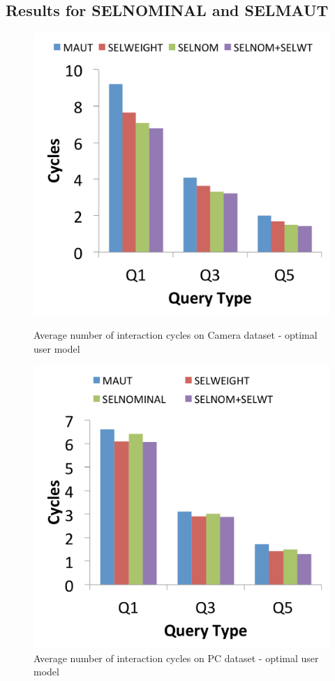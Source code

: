 \subsection{Results for SELNOMINAL and SELMAUT}

\begin{figure}[h]
\centering
\begin{minipage}{.45\textwidth}
  \centering
  \includegraphics[width=1\linewidth]{figures-bharath/sel_camera_opt}
  \caption[]{Average number of interaction cycles on Camera dataset - optimal user model}
  \label{fig:sel_camera_opt}
\end{minipage}%
\;\;\;\;\;\;
\begin{minipage}{.45\textwidth}
  \centering
  \includegraphics[width=1\linewidth]{figures-bharath/sel_pc_opt}
  \caption[]{Average number of interaction cycles on PC dataset - optimal user model}
  \label{fig:sel_pc_opt}
\end{minipage}
\end{figure}

